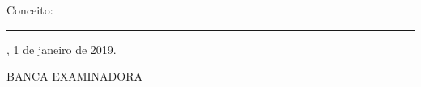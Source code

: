 \documentclass[
	12pt,				%
	openright,			%
	oneside,			%
	a4paper,			%
	english,			%
	brazil				%
	]{abntex2}
\begin{document}



%
% 
%
\begin{folhadeaprovacao}

  \begin{center}
    {\ABNTEXchapterfont\large\imprimirautor}

    \vspace*{\fill}\vspace*{\fill}
    \begin{center}
      \ABNTEXchapterfont\bfseries\Large\imprimirtitulo
    \end{center}
    \vspace*{\fill}
    
    \hspace{.45\textwidth}
    \begin{minipage}{.5\textwidth}
        \imprimirpreambulo
    \end{minipage}%
    \vspace*{\fill}
   \end{center}
        
   Conceito: \rule{3cm}{.1pt}
   
   \imprimirlocal, 1 de janeiro de 2019.
   
   \vspace{1cm}
   \begin{center}
   BANCA EXAMINADORA
   \end{center}
    

      

  
\end{folhadeaprovacao}
\end{document}
